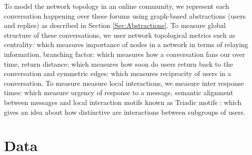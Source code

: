 \noindent{}
\noindent{}
\vspace{1cm}

To model the network topology in an online community, we represent each conversation happening over these forums using graph-based abstractions (users and replies) as described in Section \ref{Sec:Abstractions}. 
To measure global structure of these conversations, we user network topological metrics such as centrality: which measures importance of nodes in a network in terms of relaying information, branching factor: which measures how a conversation fans our over time, return distance: which measures how soon do users return back to the conversation and symmetric edges: which measures reciprocity of users in a conversation. To measure measure local interactions, we measure inter response times: which measure urgency of response to a message, semantic alignment between messages and local interaction motifs known as Triadic motifs : which gives an idea about how distinctive are interactions between subgroups of users. 

\begin{table}
    \caption{Notations and Terms.}
    \label{notations}
\end{table}


\section{Data}

